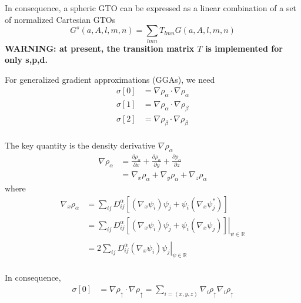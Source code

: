 \documentclass[a4paper,12pt]{article}
\begin{document}
In consequence, a spheric GTO can be expressed as a linear combination of a set of normalized Cartesian GTOs
\begin{equation}
	G^{s}(a,A,l,m,n)=\sum_{lmn}T_{lmn}G(a,A,l,m,n)
\end{equation}
\textbf{WARNING: at present, the transition matrix $T$ is implemented for only s,p,d.}

For generalized gradient approximations (GGAs), we need 
\begin{equation}
	\begin{split}
	    \sigma[0] &= \nabla \rho_{\alpha}\cdot \nabla \rho_{\alpha}\\
	    \sigma[1] &= \nabla \rho_{\alpha}\cdot \nabla \rho_{\beta}\\
	    \sigma[2] &= \nabla \rho_{\beta} \cdot \nabla \rho_{\beta}\\
    \end{split}
\end{equation}

The key quantity is the density derivative $\nabla \rho_{\alpha}$
\begin{equation}
	\begin{split}
		\nabla \rho_{\alpha} &= \frac{\partial \rho_{\alpha}} {\partial x}
		                      + \frac{\partial \rho_{\alpha}} {\partial y}
							  + \frac{\partial \rho_{\alpha}} {\partial z} \\
							  &= \nabla_{x} \rho_{\alpha} + \nabla_{y} \rho_{\alpha} + \nabla_{z} \rho_{\alpha} 
	\end{split}
\end{equation}
where
\begin{equation}
	\begin{split}
		\nabla_x \rho_{\alpha} &= \sum_{ij}D_{ij}^{\alpha}\left[(\nabla_x \psi_i)\psi_j + \psi_i(\nabla_x \psi_j^*)\right]\\
		&= \left.\sum_{ij}D_{ij}^{\alpha}\left[(\nabla_x \psi_i)\psi_j + \psi_i(\nabla_x \psi_j)\right]\right|_{\psi\in\mathbb{R}}\\
		&= \left.2\sum_{ij}D_{ij}^{\alpha}(\nabla_x \psi_i)\psi_j\right|_{\psi\in\mathbb{R}}\\
	\end{split}
\end{equation}

In consequence, 
\begin{equation}
	\begin{split}
		\sigma[0] &= \nabla \rho_{\uparrow} \cdot \nabla \rho_{\uparrow} = \sum_{i=(x,y,z)}\nabla_{i} \rho_{\uparrow}\nabla_{i}\rho_{\uparrow}\\
	\end{split}
\end{equation}
\end{document}
